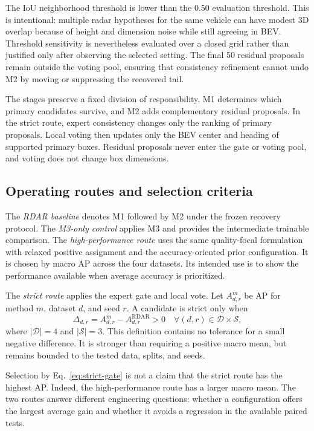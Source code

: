 \documentclass[sensors,article,submit,pdftex,moreauthors]{Definitions/mdpi}
\begin{document}
The IoU neighborhood threshold is lower than the 0.50 evaluation threshold.
This is intentional: multiple radar hypotheses for the same vehicle can have
modest 3D overlap because of height and dimension noise while still agreeing
in BEV. Threshold sensitivity is nevertheless evaluated over a closed grid
rather than justified only after observing the selected setting. The final 50
residual proposals remain outside the voting pool, ensuring that consistency
refinement cannot undo M2 by moving or suppressing the recovered tail.

The stages preserve a fixed division of responsibility. M1 determines which
primary candidates survive, and M2 adds complementary residual proposals. In
the strict route, expert consistency changes only the ranking of primary
proposals. Local voting then updates only the BEV center and heading of
supported primary boxes. Residual proposals never enter the gate or voting
pool, and voting does not change box dimensions.

\subsection{Operating routes and selection criteria}

The \emph{RDAR baseline} denotes M1 followed by M2 under the frozen recovery
protocol. The \emph{M3-only control} applies M3 and provides the
intermediate trainable comparison. The \emph{high-performance route} uses the
same quality-focal formulation with relaxed positive assignment and the
accuracy-oriented prior configuration. It is chosen by macro AP across the
four datasets. Its intended use is to show the performance available when
average accuracy is prioritized.

The \emph{strict route} applies the expert gate and local vote. Let
$A_{d,r}^{m}$ be AP for method $m$, dataset $d$, and seed $r$. A candidate is
strict only when
\begin{equation}
\Delta_{d,r}=A_{d,r}^{m}-A_{d,r}^{\mathrm{RDAR}}>0
\quad\forall(d,r)\in\mathcal{D}\times\mathcal{S},
\label{eq:strict-gate}
\end{equation}
where $\lvert\mathcal{D}\rvert=4$ and $\lvert\mathcal{S}\rvert=3$.
This definition contains no tolerance for a small negative difference. It is
stronger than requiring a positive macro mean, but remains bounded to the
tested data, splits, and seeds.

Selection by Eq.~\eqref{eq:strict-gate} is not a claim that the strict route
has the highest AP. Indeed, the high-performance route has a larger macro
mean. The two routes answer different engineering questions: whether a
configuration offers the largest average gain and whether it avoids a
regression in the available paired tests.
\end{document}
